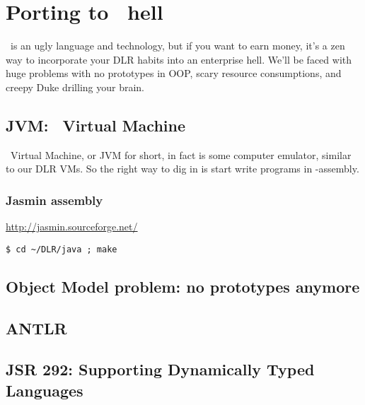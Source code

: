 \part{Porting to \J\ hell}

\J\ is an ugly language and technology, but if you want to earn money, it's a
zen way to incorporate your DLR habits into an enterprise hell. We'll be faced
with huge problems with no prototypes in OOP, scary resource consumptions, and
creepy Duke drilling your brain.

\begin{center}\end{center}

\chapter{JVM: \J\ Virtual Machine}\clearpage

\J\ Virtual Machine, or JVM for short, in fact is some computer emulator,
similar to our DLR VMs. So the right way to dig in is start write programs in
\J-assembly.

\section{Jasmin assembly}

\url{http://jasmin.sourceforge.net/}\bigskip

\begin{lstlisting}
$ cd ~/DLR/java ; make
\end{lstlisting}

\chapter{Object Model problem: no prototypes anymore}

\chapter{ANTLR}

\chapter{JSR 292: Supporting Dynamically Typed Languages}
